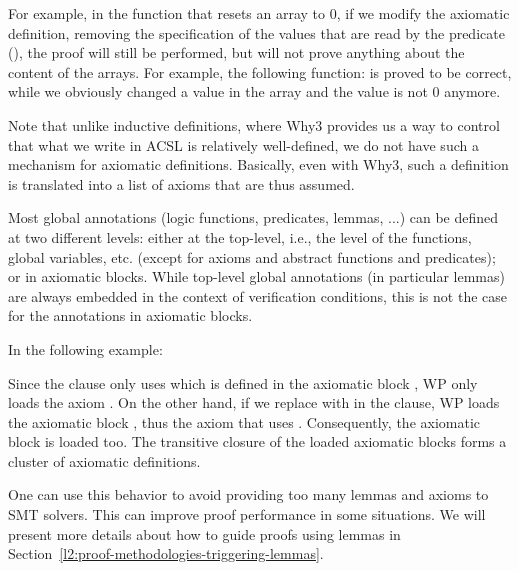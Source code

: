 For example, in the function that resets an array to 0, if we modify the
axiomatic definition, removing the specification of the values that are
read by the predicate (), the proof
will still be performed, but will not prove anything about the content
of the arrays. For example, the following function:
is proved to be correct, while we obviously changed a value in the array
and the value is not 0 anymore.



Note that unlike inductive definitions, where Why3 provides us a way to control
that what we write in ACSL is relatively well-defined, we do not have such a
mechanism for axiomatic definitions. Basically, even with Why3, such a definition
is translated into a list of axioms that are thus assumed.




Most global annotations (logic functions, predicates, lemmas, ...) can be
defined at two different levels: either at the top-level, i.e., the level of the
functions, global variables, etc. (except for axioms and abstract functions and
predicates); or in axiomatic blocks. While top-level global annotations (in
particular lemmas) are always embedded in the context of verification
conditions, this is not the case for the annotations in axiomatic blocks.


In the following example:




Since the  clause only uses  which is defined
in the axiomatic block , WP only loads the axiom .
On the other hand, if we replace  with  in the
 clause, WP loads the axiomatic block , thus
the axiom  that uses . Consequently, the axiomatic
block  is loaded too. The transitive closure of the loaded
axiomatic blocks forms a cluster of axiomatic definitions.


One can use this behavior to avoid providing too many lemmas and axioms to SMT
solvers. This can improve proof performance in some situations. We will present
more details about how to guide proofs using lemmas in
Section~\ref{l2:proof-methodologies-triggering-lemmas}.




